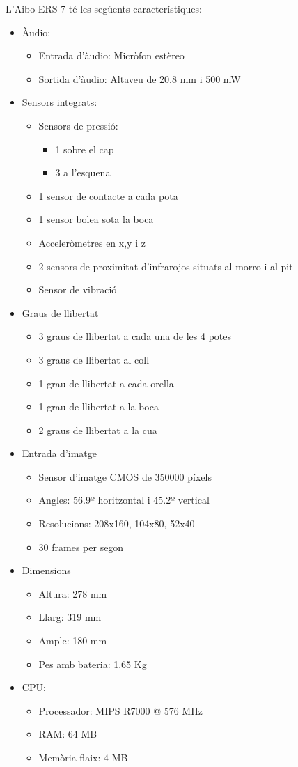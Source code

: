 \documentclass[12pt,a4paper,final,twoside]{article}
\begin{document}
L'Aibo ERS-7 té les següents característiques\cite{morales}:
\begin{itemize}
\item Àudio:
\begin{itemize}
\item Entrada d'àudio: Micròfon estèreo
\item Sortida d'àudio: Altaveu de 20.8 mm i 500 mW
\end{itemize}
\item Sensors integrats:
\begin{itemize}
\item Sensors de pressió:
\begin{itemize}
\item 1 sobre el cap
\item 3 a l'esquena
\end{itemize}
\item 1 sensor de contacte a cada pota 
\item 1 sensor bolea sota la boca
\item Acceleròmetres en x,y i z
\item 2 sensors de proximitat d'infrarojos situats al morro i al pit
\item Sensor de vibració
\end{itemize}
\item Graus de llibertat
\begin{itemize}
\item 3 graus de llibertat a cada una de les 4 potes
\item 3 graus de llibertat al coll
\item 1 grau de llibertat a cada orella
\item 1 grau de llibertat a la boca
\item 2 graus de llibertat a la cua 
\end{itemize}
\item Entrada d'imatge
\begin{itemize}
\item Sensor d'imatge CMOS de 350000 píxels
\item Angles: 56.9º horitzontal i 45.2º vertical
\item Resolucions: 208x160, 104x80, 52x40
\item 30 frames per segon
\end{itemize}
\item Dimensions
\begin{itemize}
\item Altura: 278 mm
\item Llarg: 319 mm
\item Ample: 180 mm
\item Pes amb bateria: 1.65 Kg 
\end{itemize}
\item CPU:
\begin{itemize}
\item Processador: MIPS R7000 @ 576 MHz
\item RAM: 64 MB
\item Memòria flaix: 4 MB
\end{itemize}
\end{itemize}
\end{document}
